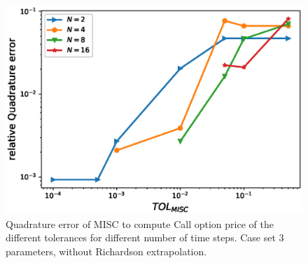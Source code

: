\documentclass[11pt]{article}
\begin{document}
\begin{figure}[h!]
\centering
\includegraphics[width=0.7\linewidth]{./figures/rBergomi_MISC_quadratre_error/vs_TOL/set3/relative_quad_error_wrt_MISC_TOL_set3_non_rich}


\caption{Quadrature error of MISC to compute Call option price of the different tolerances for different number of time steps. Case  set $3$ parameters, without Richardson extrapolation.}
\label{fig:Quadrature_error_set3}
\end{figure}
\end{document}
